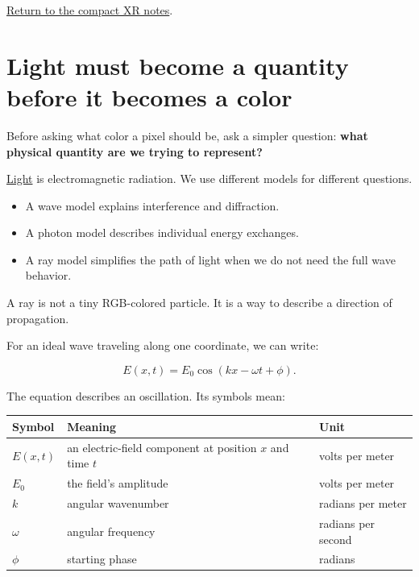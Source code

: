 \hyperref[appendix-73c6b8ed5a87-figure-linked-short-notes]{Return to the compact XR notes}.

\section{Light must become a quantity before it becomes a color}\label{04-visual-computing-ii-ch043-light-must-become-a-quantity-before-it-becomes-a-color}

Before asking what color a pixel should be, ask a simpler question: \textbf{what physical quantity are we trying to represent?}

\hyperref[appendix-215c2570199b]{Light} is electromagnetic radiation. We use different models for different questions.

\begin{itemize}
\tightlist
\item
  A wave model explains interference and diffraction.
\item
  A photon model describes individual energy exchanges.
\item
  A ray model simplifies the path of light when we do not need the full wave behavior.
\end{itemize}

A ray is not a tiny RGB-colored particle. It is a way to describe a direction of propagation.

For an ideal wave traveling along one coordinate, we can write:

\[
E(x,t)=E_0\cos(kx-\omega t+\phi).
\]

The equation describes an oscillation. Its symbols mean:

{\def\LTcaptype{none} %
\begin{longtable}[]{@{}
  >{\raggedright\arraybackslash}p{}
  >{\raggedright\arraybackslash}p{}
  >{\raggedright\arraybackslash}p{}@{}}
\toprule\noalign{}
\begin{minipage}[b]{\linewidth}\raggedright
Symbol
\end{minipage} & \begin{minipage}[b]{\linewidth}\raggedright
Meaning
\end{minipage} & \begin{minipage}[b]{\linewidth}\raggedright
Unit
\end{minipage} \\
\midrule\noalign{}
\endhead
\bottomrule\noalign{}
\endlastfoot
\(E(x,t)\) & an electric-field component at position \(x\) and time \(t\) & volts per meter \\
\(E_0\) & the field's amplitude & volts per meter \\
\(k\) & angular wavenumber & radians per meter \\
\(\omega\) & angular frequency & radians per second \\
\(\phi\) & starting phase & radians \\
\end{longtable}
}

